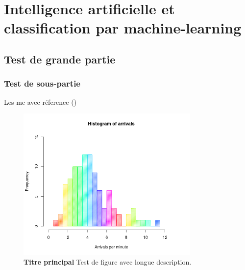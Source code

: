 \chapter{Intelligence artificielle et classification par machine-learning}
\section{Test de grande partie}
\subsection{Test de sous-partie}
Les \gls{mc} avec réference (\cite{habehh_machine_2021}) 
\begin{figure}[htbp]
  \centering
  \includegraphics[width=0.8\textwidth]{figures/figure1.png}
  \caption[Figure Test]{\textbf{Titre principal} Test de figure avec longue description.}
  \label{fig:figure-label}
\end{figure}